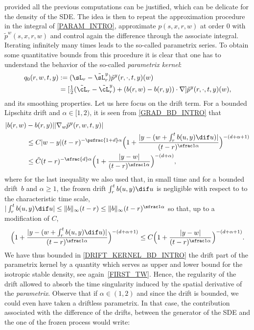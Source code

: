 {provided all the previous computations can be justified, which can be delicate for the density of the SDE. The idea is then to repeat the approximation procedure in the integral of \eqref{PARAM_INTRO}, \ie approximate $p(s,x,r,w)$ at order 0 with $\tilde p^w(s,x,r,w)$ and control again the difference through the associate integral. Iterating infinitely many times leads to the so-called parametrix series. To obtain some quantitative bounds from this procedure it is clear that one has to understand the behavior of the so-called \textit{parametrix kernel}:
\begin{align*}
q_0(r,w,t,y)&:=(\sL_{r}-\tilde \sL^{y}_r)\tilde p^y (r,\cdot,t,y)(w)\\
&=[\tfrac 12(\tilde \cL_r-\tilde \cL^{y}_{r}) +(b(r,w)-b(r, y))\cdot\nabla] \tilde p^y(r,\cdot,t,y)(w),%
\end{align*}
and its smoothing properties. Let us here focus on the drift term. For a bounded Lipschitz drift and $\alpha\in [1,2)$, it is seen from \eqref{GRAD_BD_INTRO} that
\begin{equation}\label{DRIFT_KERNEL_BD_INTRO}
\begin{aligned}
|b(r,w)&-b(r,y)||\nabla_w \tilde p^y(r,w,t,y)|\\
&\le  C |w-y|(t-r)^{-\psfrac{1+d}\alpha}\Bigl(1+\frac{|y-(w+\int_r^t b(u,y)\dif u)|}{(t-r)^{\sfrac 1\alpha}}\Bigr)^{-(d+\alpha+1)}\\
&\le  \tilde C (t-r)^{-\sfrac{d}\alpha}\Bigl(1+\frac{|y-w|}{(t-r)^{\sfrac 1\alpha}}\Bigr)^{-(d+\alpha)},
\end{aligned}
\end{equation}
where for the last inequality we also used that, in small time and for a bounded drift~$b $ and $\alpha\ge 1 $, the frozen drift $\int_r^t b(u,y)\dif u$ is negligible with respect to to the characteristic time scale, \ie $|\int_r^t b(u,y)\dif u|\le \|b\|_\infty(t-r)\le \|b\|_\infty(t-r)^{\sfrac 1\alpha} $ so that, up to a modification of $C$,
\[
\Bigl(1+\frac{|y-(w+\int_r^t b(u,y)\dif u)|}{(t-r)^{\sfrac 1\alpha}}\Bigr)^{-(d+\alpha+1)}\le C \Bigl(1+\frac{|y-w|}{(t-r)^{\sfrac 1\alpha}}\Bigr)^{-(d+\alpha+1)}.
\]
We have thus bounded in \eqref{DRIFT_KERNEL_BD_INTRO} the drift part of the parametrix kernel by a quantity which serves as upper and lower bound for the isotropic stable density, see again~\eqref{FIRST_TW}. Hence, the regularity of the drift allowed to absorb the time singularity induced by the spatial derivative of the \textit{parametrix}. Observe that if $\alpha\in (1,2) $ and since the drift is bounded, we could even have taken a driftless parametrix. In that case, the contribution associated with the difference of the drifts, between the generator of the SDE and the one of the frozen process would write:
}
